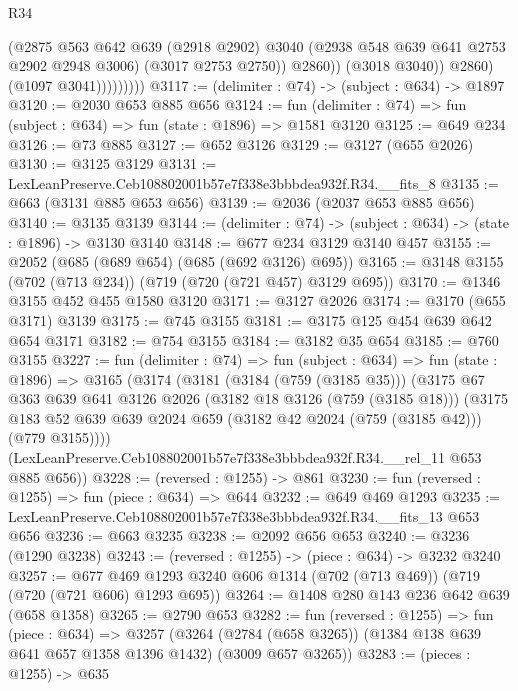 \begin{lexlean}{R34}
\begin{coremodule}
                            (@2875
                              @563
                              @642
                              @639
                              (@2918 @2902)
                              @3040
                              (@2938 @548 @639 @641 @2753 @2902 @2948 @3006)
                              (@3017 @2753 @2750))
                            @2860))
                        (@3018 @3040))
                      @2860)
                    (@1097 @3041)))))))))
@3117 := (delimiter : @74) -> (subject : @634) -> @1897
@3120 := @2030 @653 @885 @656
@3124 := fun (delimiter : @74) => fun (subject : @634) => fun (state : @1896) => @1581 @3120
@3125 := @649 @234
@3126 := @73 @885
@3127 := @652 @3126
@3129 := @3127 (@655 @2026)
@3130 := @3125 @3129
@3131 := LexLeanPreserve.Ceb108802001b57e7f338e3bbbdea932f.R34.__fits_8
@3135 := @663 (@3131 @885 @653 @656)
@3139 := @2036 (@2037 @653 @885 @656)
@3140 := @3135 @3139
@3144 := (delimiter : @74) -> (subject : @634) -> (state : @1896) -> @3130 @3140
@3148 := @677 @234 @3129 @3140 @457
@3155 := @2052 (@685 (@689 @654) (@685 (@692 @3126) @695))
@3165 := @3148 @3155 (@702 (@713 @234)) (@719 (@720 (@721 @457) @3129 @695))
@3170 := @1346 @3155 @452 @455 @1580 @3120
@3171 := @3127 @2026
@3174 := @3170 (@655 @3171) @3139
@3175 := @745 @3155
@3181 := @3175 @125 @454 @639 @642 @654 @3171
@3182 := @754 @3155
@3184 := @3182 @35 @654
@3185 := @760 @3155
@3227 := fun (delimiter : @74) =>
  fun (subject : @634) =>
  fun (state : @1896) =>
  @3165
    (@3174
      (@3181
        (@3184 (@759 (@3185 @35)))
        (@3175
          @67
          @363
          @639
          @641
          @3126
          @2026
          (@3182 @18 @3126 (@759 (@3185 @18)))
          (@3175 @183 @52 @639 @639 @2024 @659 (@3182 @42 @2024 (@759 (@3185 @42))) (@779 @3155))))
      (LexLeanPreserve.Ceb108802001b57e7f338e3bbbdea932f.R34.__rel_11 @653 @885 @656))
@3228 := (reversed : @1255) -> @861
@3230 := fun (reversed : @1255) => fun (piece : @634) => @644
@3232 := @649 @469 @1293
@3235 := LexLeanPreserve.Ceb108802001b57e7f338e3bbbdea932f.R34.__fits_13 @653 @656
@3236 := @663 @3235
@3238 := @2092 @656 @653
@3240 := @3236 (@1290 @3238)
@3243 := (reversed : @1255) -> (piece : @634) -> @3232 @3240
@3257 := @677 @469 @1293 @3240 @606 @1314 (@702 (@713 @469)) (@719 (@720 (@721 @606) @1293 @695))
@3264 := @1408 @280 @143 @236 @642 @639 (@658 @1358)
@3265 := @2790 @653
@3282 := fun (reversed : @1255) =>
  fun (piece : @634) =>
  @3257
    (@3264 (@2784 (@658 @3265)) (@1384 @138 @639 @641 @657 @1358 @1396 @1432) (@3009 @657 @3265))
@3283 := (pieces : @1255) -> @635

\end{coremodule}
\end{lexlean}
